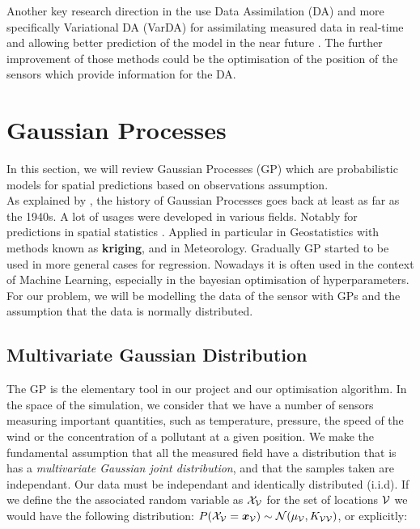 Another key research direction in the use Data Assimilation (DA) and more specifically Variational DA (VarDA) for assimilating measured data in real-time and allowing better prediction of the model in the near future \citep{arcucci_effective_2018}. The further improvement of those methods could be the optimisation of the position of the sensors which provide information for the DA.


\section{Gaussian Processes}\label{sec:theory:gp}

In this section, we will review Gaussian Processes (GP) which are probabilistic models for spatial predictions based on observations assumption. \\ 

As explained by \citet[p.~29]{rasmussen_gaussian_2006}, the history of Gaussian Processes goes back at least as far as the 1940s. A lot of usages were developed in various fields. Notably for predictions in spatial statistics \citep{cressie_statistics_1993}.  Applied in particular in Geostatistics with methods known as \textbf{kriging}, and in Meteorology. Gradually GP started to be used in more general cases for regression. Nowadays it is often used in the context of Machine Learning, especially in the bayesian optimisation of hyperparameters.  \\


For our problem, we will be modelling the data of the sensor with GPs and the assumption that the data is normally distributed. 



\subsection{Multivariate Gaussian Distribution}

The GP is the elementary tool in our project and our optimisation algorithm. In the space of the simulation, we consider that we have a  number of sensors measuring important quantities, such as temperature, pressure, the speed of the wind or the concentration of a pollutant at a given position. We make the fundamental assumption that all the measured field have a distribution that is has a \textit{multivariate Gaussian joint distribution}, and that the samples taken are independant. Our data must be independant and identically distributed (i.i.d).  If we define the the associated random variable as $\mathcal{X}_{\mathcal{V}}$ for the set of locations $\mathcal{V}$ we would have the following distribution: $P(\mathcal{X}_{\mathcal{V}} = {\boldsymbol{{x}}}_{\mathcal{V}}) \sim \mathcal{N}(\mu_{\mathcal{V}}, K_{\mathcal{V}\mathcal{V}}) $, or explicitly: 


